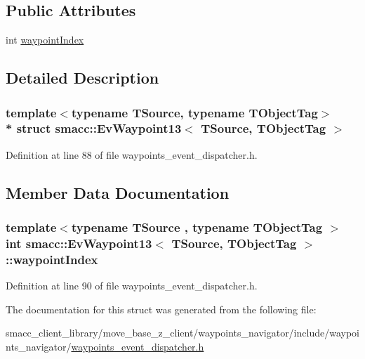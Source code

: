\subsection*{Public Attributes}
\begin{DoxyCompactItemize}
\item 
int \hyperlink{structsmacc_1_1EvWaypoint13_a34c9b782c7d46e61a3acc875b65214f6}{waypoint\+Index}
\end{DoxyCompactItemize}


\subsection{Detailed Description}
\subsubsection*{template$<$typename T\+Source, typename T\+Object\+Tag$>$\\*
struct smacc\+::\+Ev\+Waypoint13$<$ T\+Source, T\+Object\+Tag $>$}



Definition at line 88 of file waypoints\+\_\+event\+\_\+dispatcher.\+h.



\subsection{Member Data Documentation}
\subsubsection[{\texorpdfstring{waypoint\+Index}{waypointIndex}}]{\setlength{\rightskip}{0pt plus 5cm}template$<$typename T\+Source , typename T\+Object\+Tag $>$ int {\bf smacc\+::\+Ev\+Waypoint13}$<$ T\+Source, T\+Object\+Tag $>$\+::waypoint\+Index}\hypertarget{structsmacc_1_1EvWaypoint13_a34c9b782c7d46e61a3acc875b65214f6}{}\label{structsmacc_1_1EvWaypoint13_a34c9b782c7d46e61a3acc875b65214f6}


Definition at line 90 of file waypoints\+\_\+event\+\_\+dispatcher.\+h.



The documentation for this struct was generated from the following file\+:\begin{DoxyCompactItemize}
\item 
smacc\+\_\+client\+\_\+library/move\+\_\+base\+\_\+z\+\_\+client/waypoints\+\_\+navigator/include/waypoints\+\_\+navigator/\hyperlink{waypoints__event__dispatcher_8h}{waypoints\+\_\+event\+\_\+dispatcher.\+h}\end{DoxyCompactItemize}
